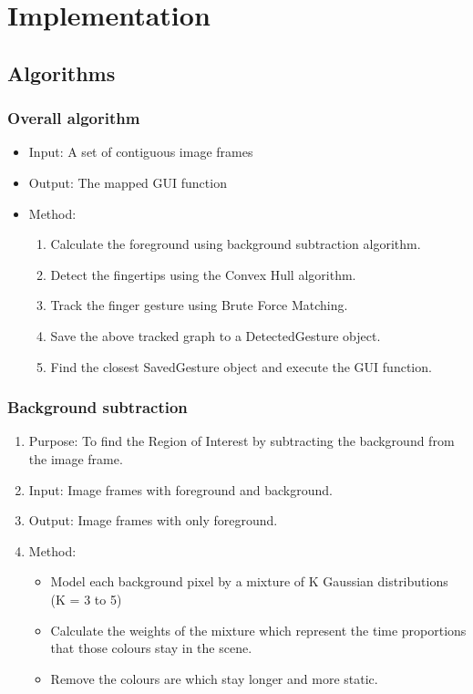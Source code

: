 \documentclass[11pt]{report}
\begin{document}
\chapter{Implementation}
\section{Algorithms}
\subsection{Overall algorithm}
\begin{itemize}
    \item Input: A set of contiguous image frames
    \item Output: The mapped GUI function
    \item Method:
    \begin{enumerate}
        \item Calculate the foreground using background subtraction algorithm.
        \item Detect the fingertips using the Convex Hull algorithm.
        \item Track the finger gesture using Brute Force Matching.
        \item Save the above tracked graph to a DetectedGesture object.
        \item Find the closest SavedGesture object and execute the GUI function.
    \end{enumerate}
\end{itemize}
\subsection{Background subtraction}
\begin{enumerate}
    \item Purpose: To find the Region of Interest by subtracting the background from the image frame.
    \item Input: Image frames with foreground and background.
    \item Output: Image frames with only foreground. 
    \item Method:
    \begin{itemize}
        \item Model each background pixel by a mixture of K Gaussian distributions (K = 3 to 5)
        \item Calculate the weights of the mixture which represent the time proportions that those colours stay in the scene.
        \item Remove the colours are which stay longer and more static.
    \end{itemize}
\end{enumerate}
\end{document}
